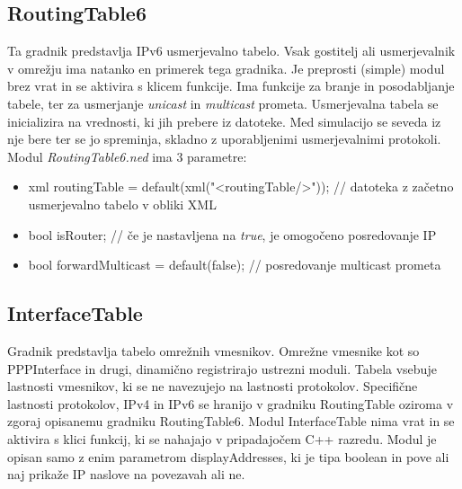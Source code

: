 \documentclass[11pt,a4paper,slovene]{myarticle}
\begin{document}
\subsection{RoutingTable6}
Ta gradnik predstavlja IPv6 usmerjevalno tabelo. Vsak gostitelj ali usmerjevalnik v omrežju ima natanko en primerek tega gradnika. Je preprosti (simple) modul brez vrat in se aktivira s klicem funkcije. Ima funkcije za branje in posodabljanje tabele, ter za usmerjanje \textit{unicast} in \textit{multicast} prometa. Usmerjevalna tabela se inicializira na vrednosti, ki jih prebere iz datoteke. Med simulacijo se seveda iz nje bere ter se jo spreminja, skladno z uporabljenimi usmerjevalnimi protokoli.\\
Modul \textit{RoutingTable6.ned} ima 3 parametre:
\begin{itemize}
\item xml routingTable = default(xml("<routingTable/>")); // datoteka z začetno usmerjevalno tabelo v obliki XML
\item bool isRouter; // če je nastavljena na \textit{true}, je omogočeno posredovanje IP
\item bool forwardMulticast = default(false); // posredovanje multicast prometa
\end{itemize}

\subsection{InterfaceTable}
Gradnik predstavlja tabelo omrežnih vmesnikov. Omrežne vmesnike kot so PPPInterface in drugi, dinamično registrirajo ustrezni moduli. Tabela vsebuje lastnosti vmesnikov, ki se ne navezujejo na lastnosti protokolov. Specifične lastnosti protokolov, IPv4 in IPv6 se hranijo v gradniku RoutingTable oziroma v zgoraj opisanemu gradniku RoutingTable6. Modul InterfaceTable nima vrat in se aktivira s klici funkcij, ki se nahajajo v pripadajočem C++ razredu. Modul je opisan samo z enim parametrom displayAddresses, ki je tipa boolean in pove ali naj prikaže IP naslove na povezavah ali ne.
\end{document}
